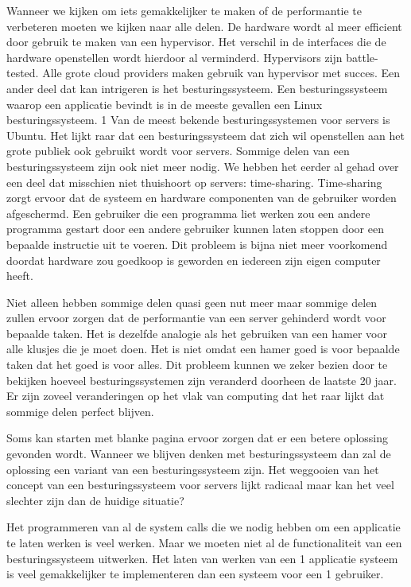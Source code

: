 \documentclass[pdftex,a4paper,12pt,twoside]{report}
\begin{document}
Wanneer we kijken om iets gemakkelijker te maken of de performantie te verbeteren moeten we kijken naar alle delen. De hardware wordt al meer efficient door gebruik te maken van een hypervisor. Het verschil in de interfaces die de hardware openstellen wordt hierdoor al verminderd. Hypervisors zijn battle-tested. Alle grote cloud providers maken gebruik van hypervisor met succes. Een ander deel dat kan intrigeren is het besturingssysteem. Een besturingssysteem waarop een applicatie bevindt is in de meeste gevallen een Linux besturingssysteem. 1 Van de meest bekende besturingssystemen voor servers is Ubuntu. Het lijkt raar dat een besturingssysteem dat zich wil openstellen aan het grote publiek ook gebruikt wordt voor servers. Sommige delen van een besturingssysteem zijn ook niet meer nodig. We hebben het eerder al gehad over een deel dat misschien niet thuishoort op servers: time-sharing. Time-sharing zorgt ervoor dat de systeem en hardware componenten van de gebruiker worden afgeschermd. Een gebruiker die een programma liet werken zou een andere programma gestart door een andere gebruiker kunnen laten stoppen door een bepaalde instructie uit te voeren. Dit probleem is bijna niet meer voorkomend doordat hardware zou goedkoop is geworden en iedereen zijn eigen computer heeft.

Niet alleen hebben sommige delen quasi geen nut meer maar sommige delen zullen ervoor zorgen dat de performantie van een server gehinderd wordt voor bepaalde taken. Het is dezelfde analogie als het gebruiken van een hamer voor alle klusjes die je moet doen. Het is niet omdat een hamer goed is voor bepaalde taken dat het goed is voor alles. Dit probleem kunnen we zeker bezien door te bekijken hoeveel besturingssystemen zijn veranderd doorheen de laatste 20 jaar. Er zijn zoveel veranderingen op het vlak van computing dat het raar lijkt dat sommige delen perfect blijven. 

Soms kan starten met blanke pagina ervoor zorgen dat er een betere oplossing gevonden wordt. Wanneer we blijven denken met besturingssysteem dan zal de oplossing een variant van een besturingssysteem zijn. Het weggooien van het concept van een besturingssysteem voor servers lijkt radicaal maar kan het veel slechter zijn dan de huidige situatie? 

Het programmeren van al de system calls die we nodig hebben om een applicatie te laten werken is veel werken. Maar we moeten niet al de functionaliteit van een besturingssysteem uitwerken. Het laten van werken van een 1 applicatie systeem is veel gemakkelijker te implementeren dan een systeem voor een 1 gebruiker.
\end{document}
